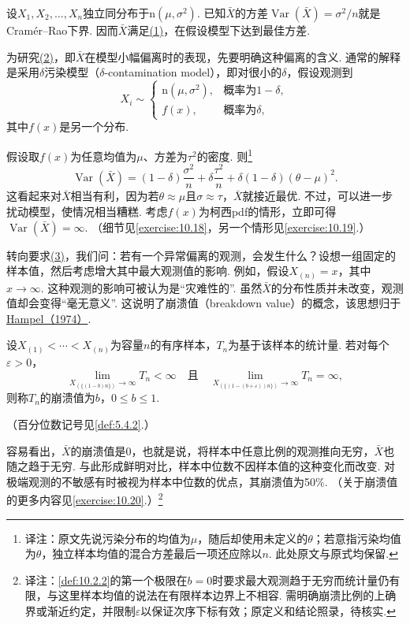 \begin{example}[样本均值的稳健性]\label{ex:10.2.1}
设$X_1,X_2,\ldots,X_n$独立同分布于$\mathrm n(\mu,\sigma^2)$. 已知$\bar X$的方差$\operatorname{Var}(\bar X)=\sigma^2/n$就是Cramér--Rao下界. 因而$\bar X$满足\hyperref[item:10.2.huber.1]{(1)}，在假设模型下达到最佳方差.

为研究\hyperref[item:10.2.huber.2]{(2)}，即$\bar X$在模型小幅偏离时的表现，先要明确这种偏离的含义. 通常的解释是采用$\delta$污染模型（$\delta$-contamination model），即对很小的$\delta$，假设观测到
$$X_i\sim\begin{cases}\mathrm n(\mu,\sigma^2),&\text{概率为$1-\delta$},\\f(x),&\text{概率为$\delta$},\end{cases}$$
其中$f(x)$是另一个分布.

假设取$f(x)$为任意均值为$\mu$、方差为$\tau^2$的密度. 则\footnote{译注：原文先说污染分布的均值为$\mu$，随后却使用未定义的$\theta$；若意指污染均值为$\theta$，独立样本均值的混合方差最后一项还应除以$n$. 此处原文与原式均保留.}
$$\operatorname{Var}(\bar X)=(1-\delta)\frac{\sigma^2}n+\delta\frac{\tau^2}n+\delta(1-\delta)(\theta-\mu)^2.$$
这看起来对$\bar X$相当有利，因为若$\theta\approx\mu$且$\sigma\approx\tau$，$\bar X$就接近最优. 不过，可以进一步扰动模型，使情况相当糟糕. 考虑$f(x)$为柯西pdf的情形，立即可得$\operatorname{Var}(\bar X)=\infty$. （细节见\autoref{exercise:10.18}，另一个情形见\autoref{exercise:10.19}.）
\end{example}

转向要求\hyperref[item:10.2.huber.3]{(3)}，我们问：若有一个异常偏离的观测，会发生什么？设想一组固定的样本值，然后考虑增大其中最大观测值的影响. 例如，假设$X_{(n)}=x$，其中$x\to\infty$. 这种观测的影响可被认为是“灾难性的”. 虽然$\bar X$的分布性质并未改变，观测值却会变得“毫无意义”. 这说明了崩溃值（breakdown value）的概念，该思想归于\hyperref[bib:source156]{Hampel（1974）}.

\begin{definition}\label{def:10.2.2}
设$X_{(1)}<\cdots<X_{(n)}$为容量$n$的有序样本，$T_n$为基于该样本的统计量. 若对每个$\varepsilon>0$，
$$\lim_{X_{(\{(1-b)n\})}\to\infty}T_n<\infty\quad\text{且}\quad
\lim_{X_{(\{(1-(b+\varepsilon))n\})}\to\infty}T_n=\infty,$$
则称$T_n$的崩溃值为$b$，$0\leq b\leq1$.
\end{definition}
（百分位数记号见\autoref{def:5.4.2}.）

容易看出，$\bar X$的崩溃值是0，也就是说，将样本中任意比例的观测推向无穷，$\bar X$也随之趋于无穷. 与此形成鲜明对比，样本中位数不因样本值的这种变化而改变. 对极端观测的不敏感有时被视为样本中位数的优点，其崩溃值为50\%. （关于崩溃值的更多内容见\autoref{exercise:10.20}.）\footnote{译注：\autoref{def:10.2.2}的第一个极限在$b=0$时要求最大观测趋于无穷而统计量仍有限，与这里样本均值的说法在有限样本边界上不相容. 需明确崩溃比例的上确界或渐近约定，并限制$\varepsilon$以保证次序下标有效；原定义和结论照录，待核实.}

